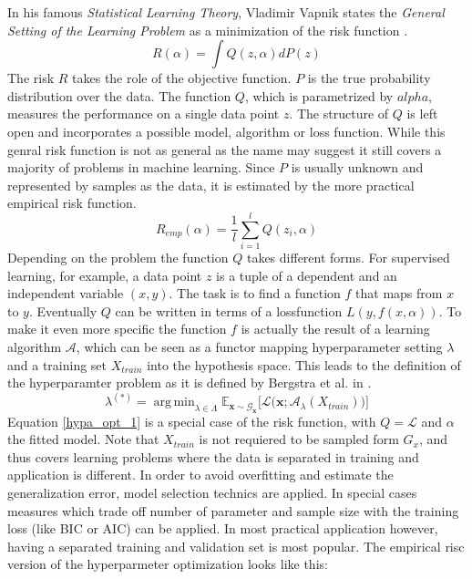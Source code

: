 \documentclass[english]{article}
\newcommand{\x}{\mathbf{x}}
\newcommand{\E}{\mathbb{E}}
\DeclareMathOperator*{\argmin}{arg\,min}
\begin{document}
In his famous \textit{Statistical Learning Theory}, Vladimir Vapnik states the \textit{General Setting of the Learning Problem} as a minimization of the risk function \cite{vapnik_overview_1999}.
\begin{equation}
R(\alpha) = \int Q(z,\alpha)dP(z)
\label{risk}
\end{equation}
The risk $R$ takes the role of the objective function. $P$ is the true probability distribution over the data. The function $Q$, which is parametrized by $alpha$, measures the performance on a single data point $z$. The structure of $Q$ is left open and incorporates a possible model, algorithm or loss function. While this genral risk function is not as general as the name may suggest it still covers a majority of problems in machine learning. Since $P$ is usually unknown and represented by samples as the data, it is estimated by the more practical empirical risk function.
\begin{equation}
R_{emp}(\alpha) = \frac{1}{l} \sum_{i=1}^l Q(z_i,\alpha)
\label{empirical risk}
\end{equation}
Depending on the problem the function $Q$ takes different forms. For supervised learning, for example, a data point $z$ is a tuple of a dependent and an independent variable $(x,y)$. The task is to find a function $f$ that maps from $x$ to $y$. Eventually $Q$ can be written in terms of a lossfunction $L(y,f(x,\alpha))$.
To make it even more specific the function $f$ is actually the result of a learning algorithm $\mathcal{A}$, which can be seen as a functor mapping hyperparameter setting $\lambda$ and a training set $X_{train}$ into the hypothesis space. This leads to the definition of the hyperparamter problem as it is defined by Bergstra et al. in \cite{bergstra_random_2012}.
\begin{equation}
\lambda^{(*)} = \argmin_{\lambda \in \Lambda} \E_{\x \sim \mathcal{G}_\x}\big[\mathcal{L}\big(\x;\mathcal{A}_\lambda(X_{train})\big)\big]
\label{hypa_opt_1}
\end{equation}
Equation \ref{hypa_opt_1} is a special case of the risk function, with $Q = \mathcal{L}$ and $\alpha$ the fitted model. Note that $X_{train}$ is not requiered to be sampled form $G_x$, and thus covers learning problems where the data is separated in training and application is different.
In order to avoid overfitting and estimate the generalization error, model selection technics are applied. In special cases measures which trade off number of parameter and sample size with the training loss (like BIC or AIC) can be applied. In most practical application however, having a separated training and validation set is most popular. The empirical risc version of the hyperparmeter optimization looks like this:
\end{document}
